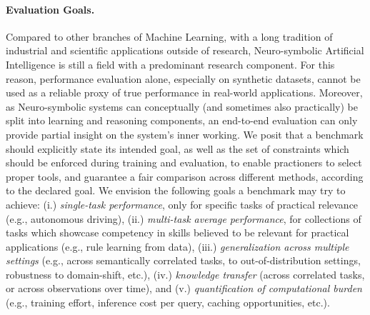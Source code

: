 \paragraph{Evaluation Goals.} Compared to other branches of Machine Learning, with a long tradition of industrial and scientific applications outside of research, Neuro-symbolic Artificial Intelligence is still a field with a predominant research component. For this reason, performance evaluation alone, especially on synthetic datasets, cannot be used as a reliable proxy of true performance in real-world applications. Moreover, as Neuro-symbolic systems can conceptually (and sometimes also practically) be split into learning and reasoning components, an end-to-end evaluation can only provide partial insight on the system's inner working.
We posit that a benchmark should explicitly state its intended goal, as well as the set of constraints which should be enforced during training and evaluation, to enable practioners to select proper tools, and guarantee a fair comparison across different methods, according to the declared goal.
%
We envision the following goals a benchmark may try to achieve: (i.) \textit{single-task performance}, only for specific tasks of practical relevance (e.g., autonomous driving), (ii.) \textit{multi-task average performance}, for collections of tasks which showcase competency in skills believed to be relevant for practical applications (e.g., rule learning from data), (iii.) \textit{generalization across multiple settings} (e.g., across semantically correlated tasks, to out-of-distribution settings, robustness to domain-shift, etc.), (iv.) \textit{knowledge transfer} (across correlated tasks, or across observations over time), and (v.) \textit{quantification of computational burden} (e.g., training effort, inference cost per query, caching opportunities, etc.).

